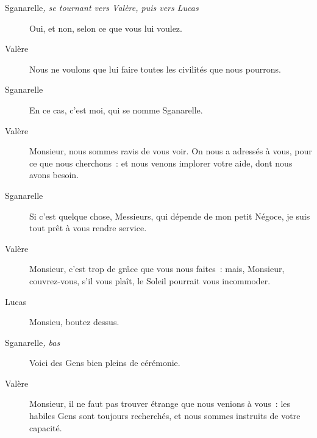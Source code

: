 \documentclass[french,twoside]{book} %
\begin{document}
 \begin{description} \item[Sganarelle\textit{, se tournant vers Valère, puis vers Lucas}\par
] 

Oui, et non, selon ce que vous lui voulez.\end{description}
 \begin{description} \item[Valère] 

Nous ne voulons que lui faire toutes les civilités que nous pourrons.\end{description}
 \begin{description} \item[Sganarelle] 

En ce cas, c’est moi, qui se nomme Sganarelle.\end{description}
 \begin{description} \item[Valère] 

Monsieur, nous sommes ravis de vous voir. On nous a adressés à vous, pour ce que nous cherchons : et nous venons implorer votre aide, dont nous avons besoin.\end{description}
 \begin{description} \item[Sganarelle] 

Si c’est quelque chose, Messieurs, qui dépende de mon petit Négoce, je suis tout prêt à vous rendre service.\end{description}
 \begin{description} \item[Valère] 

Monsieur, c’est trop de grâce que vous nous faites : mais, Monsieur, couvrez-vous, s’il vous plaît, le Soleil pourrait vous incommoder.\end{description}
 \begin{description} \item[Lucas] 

Monsieu, boutez dessus.\end{description}
 \begin{description} \item[Sganarelle\textit{, bas}\par
] 

Voici des Gens bien pleins de cérémonie.\end{description}
 \begin{description} \item[Valère] 

Monsieur, il ne faut pas trouver étrange que nous venions à vous : les habiles Gens sont toujours recherchés, et nous sommes instruits de votre capacité.\end{description}
\end{document}
